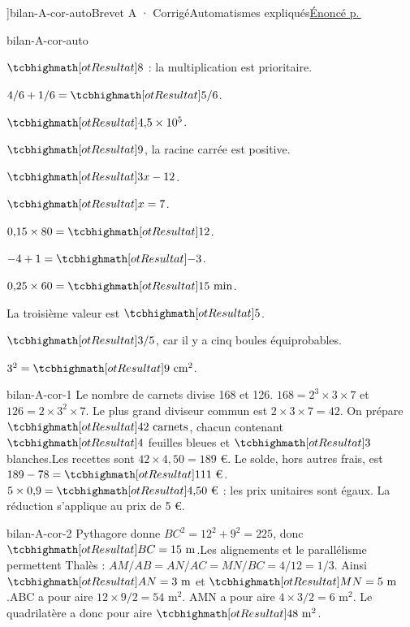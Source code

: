 \editionPage[\pdfbookmark[0]{Corrigés des brevets blancs}{bm-bilan-A-cor-auto-parent}]{bilan-A-cor-auto}{Brevet A · Corrigé}{Automatismes expliqués}{\hyperref[bilan-A-auto]{Énoncé p.\,\pageref*{bilan-A-auto}}}
\begin{blocEdition}{bilan-A-cor-auto}
\begin{questions}
\item $\res8$ : la multiplication est prioritaire.
\item $4/6+1/6=\res{5/6}$.
\item $\res{4{,}5\times10^5}$.
\item $\res9$, la racine carrée est positive.
\item $\res{3x-12}$.
\item $\res{x=7}$.
\item $0{,}15\times80=\res{12}$.
\item $-4+1=\res{-3}$.
\item $0{,}25\times60=\res{15\text{ min}}$.
\item La troisième valeur est $\res5$.
\item $\res{3/5}$, car il y a cinq boules équiprobables.
\item $3^2=\res{9\text{ cm}^2}$.\end{questions}
\end{blocEdition}
\begin{blocEdition}{bilan-A-cor-1}
Le nombre de carnets divise 168 et 126. $168=2^3\times3\times7$ et $126=2\times3^2\times7$. Le plus grand diviseur commun est $2\times3\times7=42$. On prépare $\res{42\text{ carnets}}$, chacun contenant $\res4$ feuilles bleues et $\res3$ blanches.Les recettes sont $42\times4{,}50=189$ €. Le solde, hors autres frais, est $189-78=\res{111\text{ €}}$.$5\times0{,}9=\res{4{,}50\text{ €}}$ : les prix unitaires sont égaux. La réduction s’applique au prix de 5 €.
\end{blocEdition}
\begin{blocEdition}{bilan-A-cor-2}
Pythagore donne $BC^2=12^2+9^2=225$, donc $\res{BC=15\text{ m}}$.Les alignements et le parallélisme permettent Thalès : $AM/AB=AN/AC=MN/BC=4/12=1/3$. Ainsi $\res{AN=3\text{ m}}$ et $\res{MN=5\text{ m}}$.ABC a pour aire $12\times9/2=54$ m$^2$. AMN a pour aire $4\times3/2=6$ m$^2$. Le quadrilatère a donc pour aire $\res{48\text{ m}^2}$.\label{fig-bilan-A-cor-2}

\end{blocEdition}
